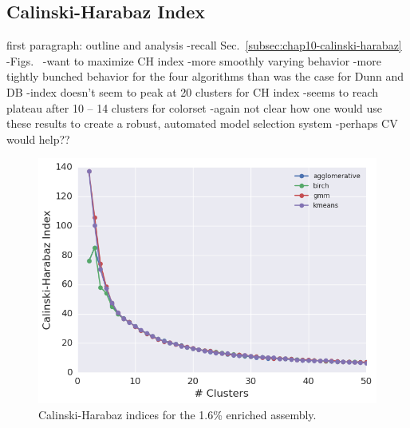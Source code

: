 \subsection{Calinski-Harabaz Index}
\label{subsec:chap11-ch-index}

first paragraph: outline and analysis
-recall Sec.~\ref{subsec:chap10-calinski-harabaz}
-Figs.~
-want to maximize CH index
-more smoothly varying behavior
-more tightly bunched behavior for the four algorithms than was the case for Dunn and DB
-index doesn't seem to peak at 20 clusters for CH index
-seems to reach plateau after 10 -- 14 clusters for colorset
-again not clear how one would use these results to create a robust, automated model selection system
  -perhaps CV would help??

\begin{figure}[h!]
\centering
\includegraphics[width=0.87\linewidth]{figures/results/model-select/assm-16/ch-combined-U238-capture-1}
\vspace{2mm}
\caption[Calinski-Harabaz indices for the 1.6\% enriched assembly]{Calinski-Harabaz indices for the 1.6\% enriched assembly.}
\label{fig:chap11-assm-16-ch-index}
\end{figure}

